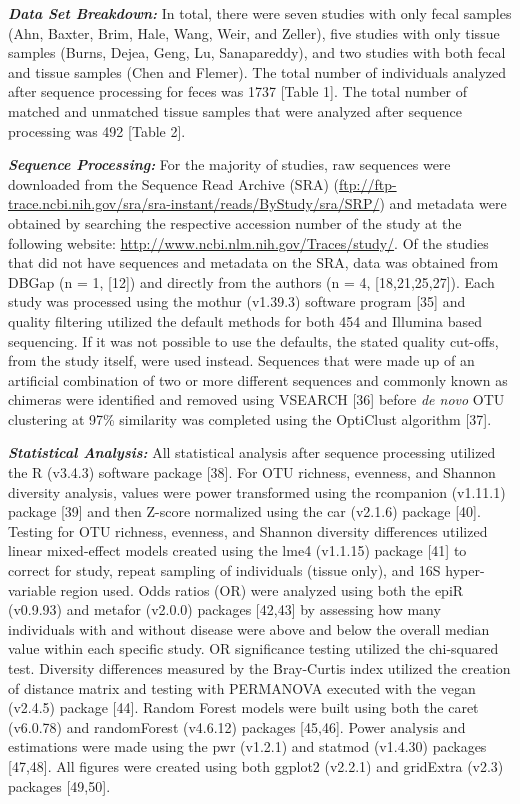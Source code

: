 \documentclass[12pt,]{article}
\begin{document}
\textbf{\emph{Data Set Breakdown:}} In total, there were seven studies
with only fecal samples (Ahn, Baxter, Brim, Hale, Wang, Weir, and
Zeller), five studies with only tissue samples (Burns, Dejea, Geng, Lu,
Sanapareddy), and two studies with both fecal and tissue samples (Chen
and Flemer). The total number of individuals analyzed after sequence
processing for feces was 1737 {[}Table 1{]}. The total number of matched
and unmatched tissue samples that were analyzed after sequence
processing was 492 {[}Table 2{]}.

\textbf{\emph{Sequence Processing:}} For the majority of studies, raw
sequences were downloaded from the Sequence Read Archive (SRA)
(\url{ftp://ftp-trace.ncbi.nih.gov/sra/sra-instant/reads/ByStudy/sra/SRP/})
and metadata were obtained by searching the respective accession number
of the study at the following website:
\url{http://www.ncbi.nlm.nih.gov/Traces/study/}. Of the studies that did
not have sequences and metadata on the SRA, data was obtained from DBGap
(n = 1, {[}12{]}) and directly from the authors (n = 4,
{[}18,21,25,27{]}). Each study was processed using the mothur (v1.39.3)
software program {[}35{]} and quality filtering utilized the default
methods for both 454 and Illumina based sequencing. If it was not
possible to use the defaults, the stated quality cut-offs, from the
study itself, were used instead. Sequences that were made up of an
artificial combination of two or more different sequences and commonly
known as chimeras were identified and removed using VSEARCH {[}36{]}
before \emph{de novo} OTU clustering at 97\% similarity was completed
using the OptiClust algorithm {[}37{]}.

\textbf{\emph{Statistical Analysis:}} All statistical analysis after
sequence processing utilized the R (v3.4.3) software package {[}38{]}.
For OTU richness, evenness, and Shannon diversity analysis, values were
power transformed using the rcompanion (v1.11.1) package {[}39{]} and
then Z-score normalized using the car (v2.1.6) package {[}40{]}. Testing
for OTU richness, evenness, and Shannon diversity differences utilized
linear mixed-effect models created using the lme4 (v1.1.15) package
{[}41{]} to correct for study, repeat sampling of individuals (tissue
only), and 16S hyper-variable region used. Odds ratios (OR) were
analyzed using both the epiR (v0.9.93) and metafor (v2.0.0) packages
{[}42,43{]} by assessing how many individuals with and without disease
were above and below the overall median value within each specific
study. OR significance testing utilized the chi-squared test. Diversity
differences measured by the Bray-Curtis index utilized the creation of
distance matrix and testing with PERMANOVA executed with the vegan
(v2.4.5) package {[}44{]}. Random Forest models were built using both
the caret (v6.0.78) and randomForest (v4.6.12) packages {[}45,46{]}.
Power analysis and estimations were made using the pwr (v1.2.1) and
statmod (v1.4.30) packages {[}47,48{]}. All figures were created using
both ggplot2 (v2.2.1) and gridExtra (v2.3) packages {[}49,50{]}.
\end{document}
